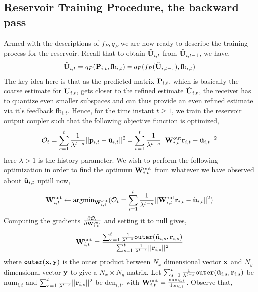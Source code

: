 \documentclass[conference]{IEEEtran}
\begin{document}
\subsection{Reservoir Training Procedure, the backward pass}
\label{train}
Armed with the descriptions of $f_P, q_P$ we are now ready to describe the training process for the reservoir.
Recall that to obtain $\tilde{{\bf U}}_{i,t}$ from  $\tilde{{\bf U}}_{i,t-1}$, we have,
\begin{equation}
\tilde{\bU}_{i,t}=q_P(\bP_{i,t},\text{fb}_{i,t})=q_P(f_P(\tilde{\bU}_{i,t-1}),\text{fb}_{i,t})
\label{fpqp}
\end{equation}
The key idea here is that as the predicted matrix ${\bf P}_{i,t}$, which is basically the coarse estimate for ${\bf U}_{i,t}$, gets closer to the refined estimate $\tilde{{\bf U}}_{i,t}$, the receiver has to quantize even smaller subspaces and can thus provide an even refined estimate via it's feedback $\text{fb}_{i,t}$.
Hence, for the time instant $t\geq1$, we train the reservoir output coupler such that the following objective function is optimized,
\begin{equation}
\mathcal{O}_t=\sum_{s=1}^{t}\frac{1}{\lambda^{t-s}}||{\bf p}_{i,t}-\tilde{{\bf u}}_{i,t}||^2=\sum_{s=1}^{t}\frac{1}{\lambda^{t-s}}||{\bf W}_{i,t}^{\text{out}}{\bf r}_{i,t}-\tilde{{\bf u}}_{i,t}||^2
\end{equation}
here $\lambda>1$ is the history parameter. We wish to perform the following optimization in order to find the optimum ${\bf W}_{i,t}^{\text{out}}$ from whatever we have observed about $\tilde{{\bf u}}_{i,t}$ uptill now,
\begin{equation}
{\bf W}_{i,t}^{\text{out}}\gets\text{argmin}_{{\bf W}_{i,t}^{\text{out}}}(\mathcal{O}_t=\sum_{s=1}^{t}\frac{1}{\lambda^{t-s}}||{\bf W}_{i,t}^{\text{out}}{\bf r}_{i,t}-\tilde{{\bf u}}_{i,t}||^2)
\end{equation}
Computing the gradients $\frac{\partial \mathcal{O}_t}{\partial {\bf W}_{i,t}^{\text{out}}}$ and setting it to null gives,
\begin{equation}
\bW_{i,t}^{\text{out}}=\frac{\sum_{s=1}^{t}\frac{1}{\lambda^{t-s}}\texttt{outer}(\tilde{\bu}_{i,s},\br_{i,s})}{\sum_{s=1}^{t}\frac{1}{\lambda^{t-s}}||\br_{i,s}||^2}
\label{backpass}
\end{equation}
where $\texttt{outer}({\bf x},{\bf y})$ is the outer product between $N_x$ dimensional vector ${\bf x}$ and $N_y$ dimensional vector ${\bf y}$ to give a $N_x\times N_y$ matrix. Let $\sum_{s=1}^{t}\frac{1}{\lambda^{t-s}}\texttt{outer}(\tilde{{\bf u}}_{i,s},{\bf r}_{i,s})$ be $\text{num}_{i,t}$ and $\sum_{s=1}^{t}\frac{1}{\lambda^{t-s}}||{\bf r}_{i,s}||^2$ be $\text{den}_{i,t}$, with ${\bf W}_{i,t}^{\text{out}}=\frac{\text{num}_{i,t}}{\text{den}_{i,t}}$. Observe that,
\end{document}

